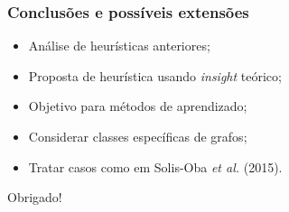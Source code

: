 \documentclass[14pt]{beamer}
\begin{document}
\begin{frame}
\frametitle{Conclus\~oes e poss\'iveis extens\~oes}
\begin{itemize}
\item An\'alise de heur\'isticas anteriores;
\item<2-> Proposta de heur\'istica usando \textit{insight} te\'orico;
\item<3-> Objetivo para m\'etodos de aprendizado;
\item<4-> Considerar classes espec\'ificas de grafos;
\item<5-> Tratar casos como em Solis-Oba \textit{et al.} (2015).
\end{itemize}
\end{frame}

\begin{frame}
\begin{center}
\huge
Obrigado!
\end{center}
\end{frame}
\end{document}
